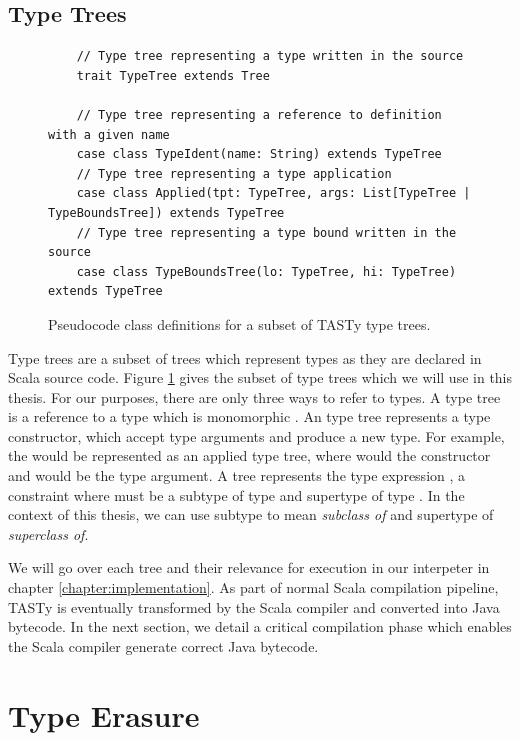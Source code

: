 \subsection{Type Trees}
\begin{figure}[!htb]
	\begin{verbatim}
	// Type tree representing a type written in the source
	trait TypeTree extends Tree 
	
	// Type tree representing a reference to definition with a given name
	case class TypeIdent(name: String) extends TypeTree 
	// Type tree representing a type application
	case class Applied(tpt: TypeTree, args: List[TypeTree | TypeBoundsTree]) extends TypeTree
	// Type tree representing a type bound written in the source
	case class TypeBoundsTree(lo: TypeTree, hi: TypeTree) extends TypeTree
	\end{verbatim} 
	\caption{Pseudocode class definitions for a subset of TASTy type trees.}
	\label{tasty:types}
\end{figure}

Type trees are a subset of trees which represent types as they are declared in Scala source code.
Figure \ref{tasty:types} gives the subset of type trees which we will use in this thesis.
For our purposes, there are only three ways to refer to types.
A  type tree is a reference to a type which is monomorphic .
An  type tree represents a type constructor, which accept type arguments and produce a new type.
For example, the  would be represented as an applied type tree, where  would the constructor and  would be the type argument.
A  tree represents the type expression , a constraint where  must be a subtype of type  and supertype of type .
In the context of this thesis, we can use subtype to mean \textit{subclass of} and supertype of \textit{superclass of}.

We will go over each tree and their relevance for execution in our interpeter in chapter \ref{chapter:implementation}.
As part of normal Scala compilation pipeline, TASTy is eventually transformed by the Scala compiler and converted into Java bytecode. 
In the next section, we detail a critical compilation phase which enables the Scala compiler generate correct Java bytecode.

\section{Type Erasure}
\label{background:type-erasure}

